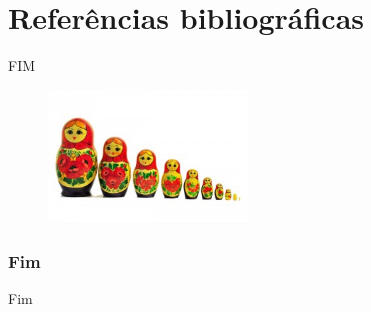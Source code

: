 \documentclass[aspectratio=169]{beamer}
\begin{document}

\section{Referências bibliográficas}


\begin{frame}
\Huge{\centerline{FIM}}

\begin{figure}[!h]
  \centering
  \includegraphics[width=150pt]{imgs/russian_dolls.jpg}
  \label{fig_fim}
\end{figure}

\end{frame}


\begin{frame}
  \frametitle{Fim}
\begin{center}
\Huge Fim
\end{center}
\end{frame}
\end{document}
